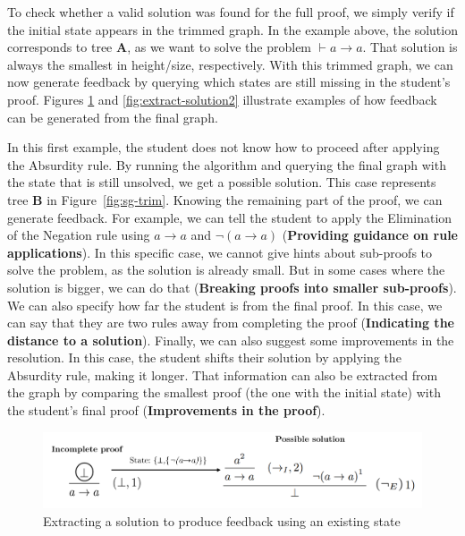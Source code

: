 \documentclass[runningheads]{llncs}
\begin{document}
To check whether a valid solution was found for the full proof, we simply verify if the initial state appears in the trimmed graph. In the example above, the solution corresponds to tree \textbf{A}, as we want to solve the problem \(\vdash a \to a\). That solution is always the smallest in height/size, respectively. With this trimmed graph, we can now generate feedback by querying which states are still missing in the student’s proof. Figures \ref{fig:extract-solution} and \ref{fig:extract-solution2} illustrate examples of how feedback can be generated from the final graph.

In this first example, the student does not know how to proceed after applying the Absurdity rule. By running the algorithm and querying the final graph with the state that is still unsolved, we get a possible solution. This case represents tree \textbf{B} in Figure~\ref{fig:sg-trim}. Knowing the remaining part of the proof, we can generate feedback. For example, we can tell the student to apply the Elimination of the Negation rule using \(a \to a \) and  \(\lnot(a \to a) \) (\textbf{Providing guidance on rule applications}). In this specific case, we cannot give hints about sub-proofs to solve the problem, as the solution is already small. But in some cases where the solution is bigger, we can do that (\textbf{Breaking proofs into smaller sub-proofs}). We can also specify how far the student is from the final proof. In this case, we can say that they are two rules away from completing the proof (\textbf{Indicating the distance to a solution}). Finally, we can also suggest some improvements in the resolution. In this case, the student shifts their solution by applying the Absurdity rule, making it longer. That information can also be extracted from the graph by comparing the smallest proof (the one with the initial state) with the student’s final proof (\textbf{Improvements in the proof}).

 
\vspace{-1em}
\begin{figure}[H]
    \centering
    \includegraphics[width=1\linewidth]{resources/trim-pos-feed.png}
    \caption{Extracting a solution to produce feedback using an existing state}
    \label{fig:extract-solution}
\end{figure}
\vspace{-2em}
\end{document}
